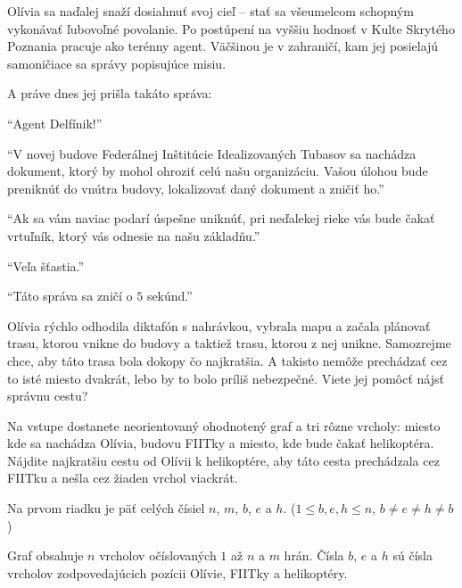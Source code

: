 





Olívia sa naďalej snaží dosiahnuť svoj cieľ -- stať sa všeumelcom schopným vykonávať ľubovoľné
povolanie. Po postúpení na vyššiu hodnosť v Kulte Skrytého Poznania pracuje ako terénny agent.
Väčšinou je v zahraničí, kam jej posielajú samoničiace sa správy popisujúce misiu.

A práve dnes jej prišla takáto správa:

\bigskip

``Agent Delfínik!''

``V novej budove Federálnej Inštitúcie Idealizovaných Tubasov sa nachádza dokument, ktorý by mohol ohroziť
celú našu organizáciu. Vašou úlohou bude preniknúť do vnútra budovy, lokalizovať daný dokument a
zničiť ho.''

``Ak sa vám naviac podarí úspešne uniknúť, pri neďalekej rieke vás bude čakať vrtuľník, ktorý vás
odnesie na našu základňu.''

``Veľa šťastia.''

``Táto správa sa zničí o $5$ sekúnd.''

\bigskip

Olívia rýchlo odhodila diktafón s nahrávkou, vybrala mapu a začala plánovať trasu, ktorou vnikne do
budovy a taktiež trasu, ktorou z nej unikne. Samozrejme chce, aby táto trasa bola dokopy čo
najkratšia. A takisto nemôže prechádzať cez to isté miesto dvakrát, lebo by to bolo príliš
nebezpečné. Viete jej pomôcť nájsť správnu cestu?


Na vstupe dostanete neorientovaný ohodnotený graf a tri rôzne vrcholy: miesto kde sa nachádza
Olívia, budovu FIITky a miesto, kde bude čakať helikoptéra. Nájdite najkratšiu cestu od Olívii k
helikoptére, aby táto cesta prechádzala cez FIITku a nešla cez žiaden vrchol viackrát.


Na prvom riadku je päť celých čísiel $n$, $m$, $b$, $e$ a $h$.
($1 \le b, e, h \le n$, $b \neq e \neq h \neq b$)

Graf obsahuje $n$ vrcholov očíslovaných $1$ až $n$ a $m$ hrán. Čísla $b$, $e$ a $h$ sú čísla
vrcholov zodpovedajúcich pozícii Olívie, FIITky a helikoptéry.

